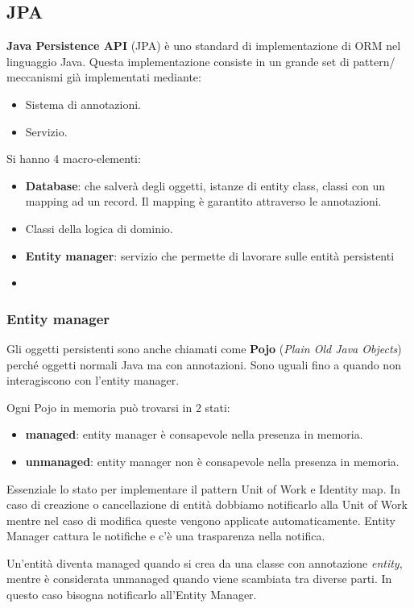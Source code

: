 \subsection{JPA}
\textbf{Java Persistence API} (JPA) è uno standard di implementazione di ORM nel
linguaggio Java. Questa implementazione consiste in un grande set di pattern/
meccanismi già implementati mediante:
\begin{itemize}
      \item Sistema di annotazioni.
      \item Servizio.
\end{itemize}
Si hanno 4 macro-elementi:
\begin{itemize}
      \item \textbf{Database}: che salverà degli oggetti, istanze di entity class,
            classi con un mapping ad un record. Il mapping è garantito attraverso
            le annotazioni.
      \item Classi della logica di dominio.
      \item \textbf{Entity manager}: servizio che permette di lavorare sulle entità
            persistenti
      \item %
\end{itemize}
\subsubsection{Entity manager}
Gli oggetti persistenti sono anche chiamati come \textbf{Pojo} (\textit{Plain Old
      Java Objects}) perché oggetti normali Java ma con annotazioni. Sono uguali
fino a quando non interagiscono con l'entity manager.

Ogni Pojo in memoria può trovarsi in 2 stati:
\begin{itemize}
      \item \textbf{managed}: entity manager è consapevole nella presenza in
            memoria.
      \item \textbf{unmanaged}: entity manager non è consapevole nella presenza
            in memoria.
\end{itemize}
Essenziale lo stato per implementare il pattern Unit of Work e Identity map.
In caso di creazione o cancellazione di entità dobbiamo notificarlo alla Unit of
Work mentre nel caso di modifica queste vengono applicate automaticamente.
Entity Manager cattura le notifiche e c'è una trasparenza nella notifica.

Un'entità diventa managed quando si crea da una classe con annotazione
\textit{entity}, mentre è considerata unmanaged quando viene scambiata tra diverse
parti. In questo caso bisogna notificarlo all'Entity Manager.


